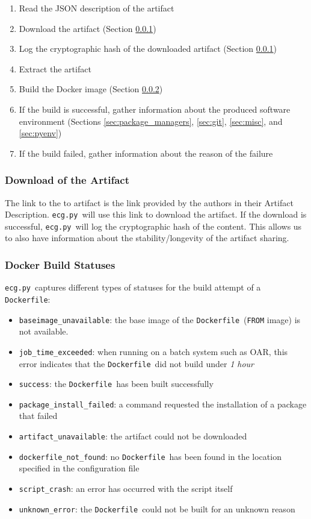 \documentclass{article}
\newcommand{\noteqg}{\todo[backgroundcolor=blue!10,bordercolor=blue,inline,caption={}]}
\newcommand{\dfile}{\texttt{Dockerfile}}
\newcommand{\ecg}{\texttt{ecg.py}}
\begin{document}
\begin{enumerate}
\item Read the JSON description of the artifact
\item Download the artifact (Section \ref{sec:download})
\item Log the cryptographic hash of the downloaded artifact (Section \ref{sec:download})
\item Extract the artifact
\item Build the Docker image (Section \ref{sec:docker_build})
\item If the build is successful, gather information about the produced software environment (Sections \ref{sec:package_managers}, \ref{sec:git}, \ref{sec:misc}, and \ref{sec:pyenv})
\item If the build failed, gather information about the reason of the failure
\end{enumerate}

\noteqg{should probably be a flowgraph}

\subsubsection{Download of the Artifact}\label{sec:download}

The link to the to artifact is the link provided by the authors in their Artifact Description.
\ecg\ will use this link to download the artifact.
If the download is successful, \ecg\ will log the cryptographic hash of the content.
This allows us to also have information about the stability/longevity of the artifact sharing.

\subsubsection{Docker Build Statuses}\label{sec:docker_build}

\ecg\ captures different types of statuses for the build attempt of a \dfile:

\begin{itemize}
  \item \texttt{baseimage\_unavailable}: the base image of the \dfile\ (\texttt{FROM} image) is not available.
  \item \texttt{job\_time\_exceeded}: when running on a batch system such as OAR, this error indicates that the \dfile\ did not build under \emph{1 hour}
  \item \texttt{success}: the \dfile\ has been built successfully
  \item \texttt{package\_install\_failed}: a command requested the installation of a package that failed
  \item \texttt{artifact\_unavailable}: the artifact could not be downloaded
  \item \texttt{dockerfile\_not\_found}: no \dfile\ has been found in the location specified in the configuration file
  \item \texttt{script\_crash}: an error has occurred with the script itself
  \item \texttt{unknown\_error}: the \dfile\ could not be built for an unknown reason
\end{itemize}
\end{document}
